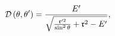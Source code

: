 \begin{equation}
\mathcal{D}\left( \theta ,\theta ^{\prime }\right) =\frac{E^{\prime }}{\sqrt{%
\frac{\frak{r}^{\prime 2}}{\sin ^{2}\theta }+\frak{r}^{2}-E^{\prime }}},
\label{displacement}
\end{equation}

